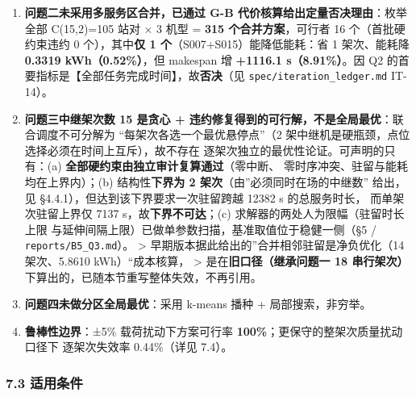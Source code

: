 \documentclass[
  10.5pt,
]{article}
\providecommand{\tightlist}{%
  \setlength{\itemsep}{0pt}\setlength{\parskip}{0pt}}
\begin{document}
\begin{enumerate}
\def\labelenumi{\arabic{enumi}.}
\tightlist
\item
  \textbf{问题二未采用多服务区合并，已通过 G-B
  代价核算给出定量否决理由}：枚举全部 C(15,2)=105 站对 × 3 机型 =
  \textbf{315 个合并方案}，可行者 16 个（首批硬约束违约 0
  个），其中\textbf{仅 1 个}（S007+S015）能降低能耗：省 1 架次、能耗降
  \textbf{0.3319 kWh（0.52\%）}，但 makespan 增 \textbf{+1116.1
  s（8.91\%）}。因 Q2
  的首要指标是【全部任务完成时间】，故\textbf{否决}（见
  \texttt{spec/iteration\_ledger.md} IT-14）。
\item
  \textbf{问题三中继架次数 15 是贪心 +
  违约修复得到的可行解，不是全局最优}：联合调度不可分解为
  ``每架次各选一个最优悬停点''（2
  架中继机是硬瓶颈，点位选择必须在时间上互斥），故不存在
  逐架次独立的最优性论证。可声明的只有：(a)
  \textbf{全部硬约束由独立审计复算通过}（零中断、
  零时序冲突、驻留与能耗均在上界内）；(b) 结构性\textbf{下界为 2
  架次}（由''必须同时在场的中继数'' 给出，见
  §4.4.1），但达到该下界要求一次驻留跨越 12382 s 的总服务时长，
  而单架次驻留上界仅 7137 s，故\textbf{下界不可达}；(c)
  求解器的两处人为限幅（驻留时长上限
  与延伸间隔上限）已做单参数扫描，基准取值位于稳健一侧（§5 /
  \texttt{reports/B5\_Q3.md}）。 \textgreater{}
  早期版本据此给出的''合并相邻驻留是净负优化（14 架次、5.8610
  kWh）``成本核算， \textgreater{} 是在\textbf{旧口径（继承问题一 18
  串行架次）}下算出的，已随本节重写整体失效，不再引用。
\item
  \textbf{问题四未做分区全局最优}：采用 k-means 播种 +
  局部搜索，非穷举。
\item
  \textbf{鲁棒性边界}：±5\% 载荷扰动下方案可行率
  \textbf{100\%}；更保守的整架次质量扰动口径下 逐架次失效率 0.44\%（详见
  7.4）。
\end{enumerate}

\subsubsection{7.3 适用条件}\label{ux9002ux7528ux6761ux4ef6}
\end{document}
